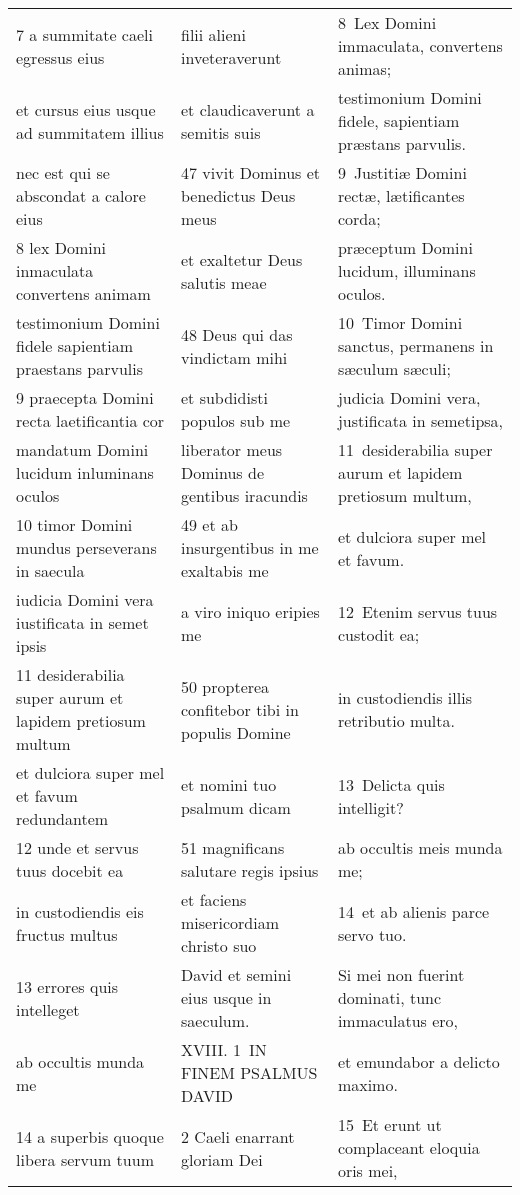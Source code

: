 \documentclass{article}
\begin{document}
\begin{longtable}{@{}p{}p{}p{}@{}}
7 a summitate caeli egressus eius	&	filii alieni inveteraverunt	&	8 Lex Domini immaculata, convertens animas;	\\
et cursus eius usque ad summitatem illius	&	et claudicaverunt a semitis suis	&	testimonium Domini fidele, sapientiam præstans parvulis.	\\
nec est qui se abscondat a calore eius	&	47 vivit Dominus et benedictus Deus meus	&	9 Justitiæ Domini rectæ, lætificantes corda;	\\
8 lex Domini inmaculata convertens animam	&	et exaltetur Deus salutis meae	&	præceptum Domini lucidum, illuminans oculos.	\\
testimonium Domini fidele sapientiam praestans parvulis	&	48 Deus qui das vindictam mihi	&	10 Timor Domini sanctus, permanens in sæculum sæculi;	\\
9 praecepta Domini recta laetificantia cor	&	et subdidisti populos sub me	&	judicia Domini vera, justificata in semetipsa,	\\
mandatum Domini lucidum inluminans oculos	&	liberator meus Dominus de gentibus iracundis	&	11 desiderabilia super aurum et lapidem pretiosum multum,	\\
10 timor Domini mundus perseverans in saecula	&	49 et ab insurgentibus in me exaltabis me	&	et dulciora super mel et favum.	\\
iudicia Domini vera iustificata in semet ipsis	&	a viro iniquo eripies me	&	12 Etenim servus tuus custodit ea;	\\
11 desiderabilia super aurum et lapidem pretiosum multum	&	50 propterea confitebor tibi in populis Domine	&	in custodiendis illis retributio multa.	\\
et dulciora super mel et favum redundantem	&	et nomini tuo psalmum dicam	&	13 Delicta quis intelligit?	\\
12 unde et servus tuus docebit ea	&	51 magnificans salutare regis ipsius	&	ab occultis meis munda me;	\\
in custodiendis eis fructus multus	&	et faciens misericordiam christo suo	&	14 et ab alienis parce servo tuo.	\\
13 errores quis intelleget	&	David et semini eius usque in saeculum.	&	Si mei non fuerint dominati, tunc immaculatus ero,	\\
ab occultis munda me	&	XVIII. 1 IN FINEM PSALMUS DAVID	&	et emundabor a delicto maximo.	\\
14 a superbis quoque libera servum tuum	&	2 Caeli enarrant gloriam Dei	&	15 Et erunt ut complaceant eloquia oris mei,	\\

\end{longtable}
\end{document}
